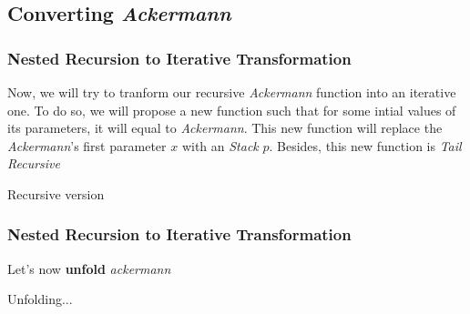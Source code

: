 \documentclass{beamer}
\begin{document}
\subsection{Converting \textit{Ackermann}}
\begin{frame}
	\frametitle{Nested Recursion to Iterative Transformation}
	Now, we will try to tranform our recursive \textit{Ackermann} function into an iterative one. To do so, we will propose a new function such that for some intial values of its parameters, it will equal to \textit{Ackermann}. This new function will replace the \textit{Ackermann}'s first parameter $x$ with an \textit{Stack} $p$. Besides, this new function is \textit{Tail Recursive}
	\begin{block}{Recursive version}
		\begin{algorithmic}[1]
					\State{}
				\Else
					\State{}
				\EndIf
			\EndProcedure
		\end{algorithmic}
	\end{block}
\end{frame}
\begin{frame}
	\frametitle{Nested Recursion to Iterative Transformation}
	Let's now \textbf{unfold} \textit{ackermann}
	\begin{block}{Unfolding...}
		\begin{algorithmic}[1]
			\tiny
					\State{}
				\Else
						\State{}
					\Else
							\State{}
						\Else
							\State{}
						\EndIf
					\EndIf
				\EndIf
			\EndProcedure
		\end{algorithmic}
	\end{block}
\end{frame}
\end{document}
